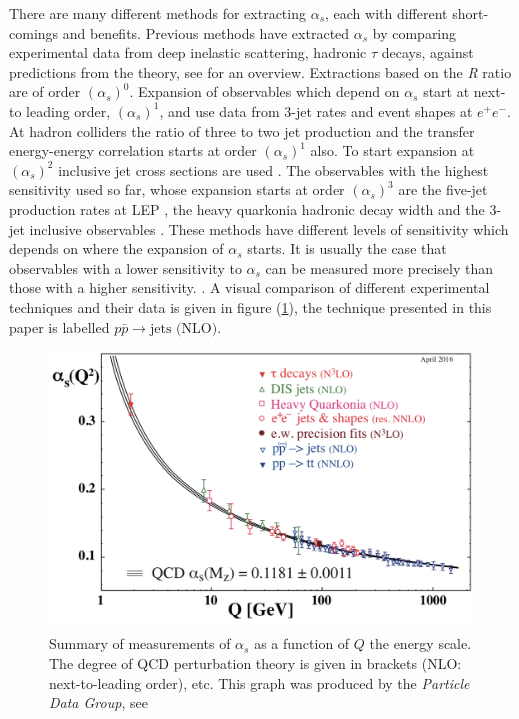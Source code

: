 \documentclass[12pt, onecolumn]{revtex4}    %
\begin{document}
There are many different methods for extracting ${\alpha_s}$, each with different short-comings and benefits. Previous methods have extracted ${\alpha_s}$ by comparing experimental data from deep inelastic scattering,  hadronic ${\tau}$ decays, against predictions from the theory, see \cite{PPB} for an overview. Extractions based on the \textit{R} ratio are of order ${(\alpha_s)^0}$. Expansion of observables which depend on ${\alpha_s}$ start at next-to leading order, ${(\alpha_s)^1}$, and use data from 3-jet rates and event shapes at ${e^+e^-}$. At hadron colliders the ratio of three to two jet production \cite{2to3} and the transfer energy-energy correlation \cite{en2en} starts at order ${(\alpha_s)^1}$ also. To start expansion at ${(\alpha_s)^2}$ inclusive jet cross sections are used \cite{inc}. The observables with the highest sensitivity used so far, whose expansion starts at order ${(\alpha_s)^3}$ are  the five-jet production rates at LEP \cite{LEP}, the heavy quarkonia hadronic decay width \cite{HAD} and the 3-jet inclusive observables \cite{3jet}. These methods have different levels of sensitivity which depends on where the expansion of ${\alpha_s}$ starts. It is usually the case that observables with a lower sensitivity to ${\alpha_s}$ can be measured more precisely than those with a higher sensitivity. \cite{DMP}. A visual comparison of different experimental techniques and their data is given in figure (\ref{allas}), the technique presented in this paper is labelled ${p\bar{p} \rightarrow \text{jets (NLO)}}$.  
\begin{figure} 
	\begin{center}
		\includegraphics[width=1 \textwidth]{as_allq.jpg}
		\caption{Summary of measurements of ${\alpha_s}$ as a function of ${Q}$ the energy scale. The degree of QCD perturbation theory is given in brackets (NLO: next-to-leading order), etc. This graph was produced by the \textit{Particle Data Group}, see \cite{PPB}}
		\label{allas}
	\end{center}
\end{figure}
\end{document}
